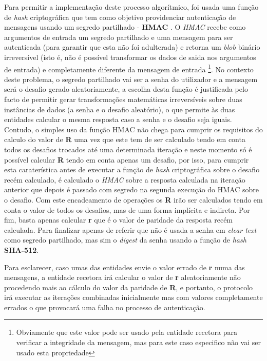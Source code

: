 \quad Para permitir a implementação deste processo algorítmico, foi usada uma função de \textit{hash} criptográfica que tem como objetivo providenciar autenticação de mensagens usando um segredo partilhado - \textbf{HMAC} \cite{hmac}. O \textit{HMAC} recebe como argumentos de entrada um segredo partilhado e uma mensagem para ser autenticada (para garantir que esta não foi adulterada) e retorna um \textit{blob} binário irreversível (isto é, não é possível transformar os dados de saida nos argumentos de entrada) e completamente diferente da mensagem de entrada \footnote{Obviamente que este valor pode ser usado pela entidade recetora para verificar a integridade da mensagem, mas para este caso especifico não vai ser usado esta propriedade}. No contexto deste problema, o segredo partilhado vai ser a senha do utilizador e a mensagem será o desafio gerado aleatoriamente, a escolha desta função é justificada pelo facto de permitir gerar transformações matemáticas irreversíveis sobre duas instâncias de dados (a senha e o desafio aleatório), o que permite às duas entidades calcular o mesma resposta caso a senha e o desafio seja iguais. Contudo, o simples uso da função HMAC não chega para cumprir os requisitos do calculo do valor de \textbf{R} uma vez que este tem de ser calculado tendo em conta todos os desafios trocados até uma determinada iteração e neste momento só é possível calcular \textbf{R} tendo em conta apenas um desafio, por isso, para cumprir esta caraterística antes de executar a função de \textit{hash} criptográfica sobre o desafio recém calculado, é calculado o \textit{HMAC} sobre a resposta calculada na iteração anterior que depois é passado com segredo na segunda execução do HMAC sobre o desafio. Com este encadeamento de operações os \textbf{R} irão ser calculados tendo em conta o valor de todos os desafios, mas de uma forma implícita e indireta. Por fim, basta apenas calcular \textbf{r} que é o valor de paridade da resposta recém calculada. Para finalizar apenas de referir que não é usada a senha em \textit{clear text} como segredo partilhado, mas sim o \textit{digest} da senha usando a função de \textit{hash} \textbf{SHA-512}.

\quad Para esclarecer, caso umas das entidades envie o valor errado de \textbf{r} numa das mensagens, a entidade recetora irá calcular o valor de \textbf{r} aleatoriamente não procedendo mais ao cálculo do valor da paridade de \textbf{R}, e portanto, o protocolo irá executar as iterações combinadas inicialmente mas com valores completamente errados o que provocará uma falha no processo de autenticação.


